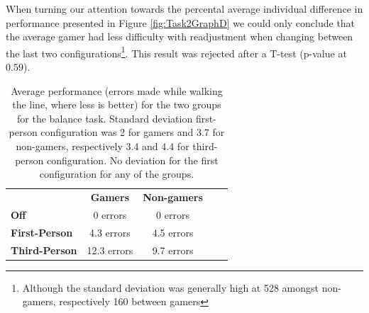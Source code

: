\documentclass[runningheads,a4paper,oribibl]{llncs}
\begin{document}
When turning our attention towards the percental average individual difference in performance presented in Figure \ref{fig:Task2GraphD} we could only conclude that the average gamer had less difficulty with readjustment when changing between the last two configurations\footnote{Although the standard deviation was generally high at 528 amongst non-gamers, respectively 160 between gamers}. This result was rejected after a T-test (p-value at 0.59).


\begin{table}[]
\centering
\setlength{\tabcolsep}{1em}
\def\arraystretch{1.8}
\begin{tabular}{l|c|cll}
                      & {\textbf{Gamers}} & {\textbf{Non-gamers}} &  &  \\ \cline{1-3}
\textbf{Off}          & 0 errors                                    & 0 errors                                          &  &  \\ \cline{1-3}
\textbf{First-Person} & 4.3 errors                                   & 4.5 errors                                        &  &  \\ \cline{1-3}
\textbf{Third-Person} & 12.3 errors                                    & 9.7 errors                                        &  & 
\end{tabular}
\caption{Average performance (errors made while walking the line, where less is better) for the two groups for the balance task. Standard deviation first-person configuration was 2 for gamers and 3.7 for non-gamers, respectively 3.4 and 4.4 for third-person configuration. No deviation for the first configuration for any of the groups.}
\label{tab:Task2GraphP}
\end{table}




\end{document}
